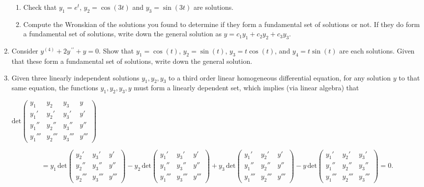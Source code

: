 \documentclass{ximera}
\newcommand{\inbetween}{\fontsize{7pt}{9pt}\selectfont}
\begin{document}
\begin{enumerate}
\begin{enumerate}

\item Check that $y_{1}=e^{t}$, $y_2=\cos{(3t)}$ and $y_3=\sin{(3t)}$ are solutions.

\vfill



\item Compute the Wronskian of the solutions you found to determine if they form a fundamental set of solutions or not.  If they do form a fundamental set of solutions, write down the general solution as $y=c_1y_1+c_2y_2+c_3y_3$.



\vfill


\end{enumerate}

\newpage

\item Consider $y^{(4)}+2y^{\,\prime\prime}+y=0$. Show that $y_1=\cos{(t)}$, $y_2=\sin{(t)}$, $y_3=t\cos{(t)}$, and $y_4=t\sin{(t)}$ are each solutions.  Given that these form a fundamental set of solutions, write down the general solution.


\newpage

\item Given three linearly independent solutions $y_1,y_2,y_3$ to a third order linear homogeneous differential equation, for any solution $y$ to that same equation, the functions $y_1,y_2,y_3,y$ must form a linearly dependent set, which implies (via linear algebra) that 


{\inbetween
$\displaystyle
\mathrm{det}\left(\begin{array}{cccc} y_1 & y_2 & y_3 & y\\ y_1' & y_2' & y_3'  & y'\\ y_1'' & y_2'' & y_3'' & y'' \\ y_1''' & y_2''' & y_3''' & y''' \end{array}\right) $ 


$$= y_1\,\mathrm{det}\left(\begin{array}{ccc} y_2' & y_3' & y'\\ y_2'' & y_3'' & y''\\  y_2''' & y_3''' & y'''\end{array}\right)-y_2\,\mathrm{det}\left(\begin{array}{ccc} y_1' & y_3' & y'\\ y_1'' & y_3'' & y''\\ y_1''' & y_3''' & y''' \end{array}\right) + y_3\,\mathrm{det}\left(\begin{array}{ccc} y_1' & y_2' & y'\\ y_1'' & y_2'' & y''\\ y_1''' & y_2''' & y'''\end{array}\right)-y\,\mathrm{det}\left(\begin{array}{ccc} y_1' & y_2' & y_3'\\ y_1'' & y_2'' & y_3''\\ y_1''' & y_2''' & y_3'''\end{array}\right)=0.$$}


\end{enumerate}
\end{document}

